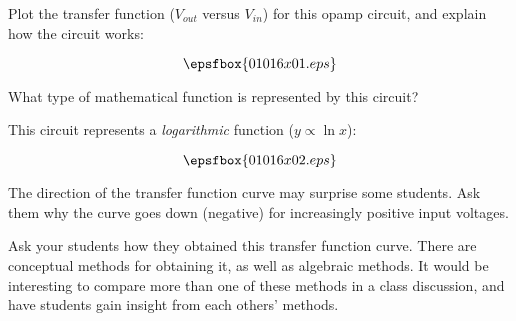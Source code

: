 

Plot the transfer function ($V_{out}$ versus $V_{in}$) for this opamp circuit, and explain how the circuit works:
 
$$\epsfbox{01016x01.eps}$$

What type of mathematical function is represented by this circuit?







This circuit represents a {\it logarithmic} function ($y \propto \ln x$):

$$\epsfbox{01016x02.eps}$$







The direction of the transfer function curve may surprise some students.  Ask them why the curve goes down (negative) for increasingly positive input voltages.

Ask your students how they obtained this transfer function curve.  There are conceptual methods for obtaining it, as well as algebraic methods.  It would be interesting to compare more than one of these methods in a class discussion, and have students gain insight from each others' methods.




